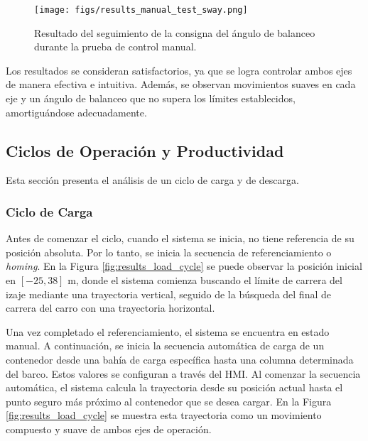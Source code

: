 \documentclass{article}
\begin{document}
            \begin{figure} [H]
                \centering
                \texttt{[image: figs/results\_manual\_test\_sway.png]}
                \caption{Resultado del seguimiento de la consigna del ángulo de balanceo durante la prueba de control manual.}
                \label{fig:results_manual_test_sway}
            \end{figure}

            Los resultados se consideran satisfactorios, ya que se logra controlar ambos ejes de manera efectiva e intuitiva. Además, se observan movimientos suaves en cada eje y un ángulo de balanceo que no supera los límites establecidos, amortiguándose adecuadamente.

            \subsection{Ciclos de Operación y Productividad}

            Esta sección presenta el análisis de un ciclo de carga y de descarga.

            \subsubsection{Ciclo de Carga}

            Antes de comenzar el ciclo, cuando el sistema se inicia, no tiene referencia de su posición absoluta. Por lo tanto, se inicia la secuencia de referenciamiento o \textit{homing}. En la Figura \ref{fig:results_load_cycle} se puede observar la posición inicial en \([-25,38]\) m, donde el sistema comienza buscando el límite de carrera del izaje mediante una trayectoria vertical, seguido de la búsqueda del final de carrera del carro con una trayectoria horizontal.

            Una vez completado el referenciamiento, el sistema se encuentra en estado manual. A continuación, se inicia la secuencia automática de carga de un contenedor desde una bahía de carga específica hasta una columna determinada del barco. Estos valores se configuran a través del HMI. Al comenzar la secuencia automática, el sistema calcula la trayectoria desde su posición actual hasta el punto seguro más próximo al contenedor que se desea cargar. En la Figura \ref{fig:results_load_cycle} se muestra esta trayectoria como un movimiento compuesto y suave de ambos ejes de operación.
\end{document}

